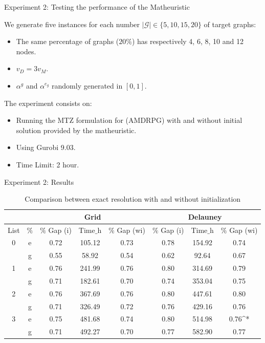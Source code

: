 \documentclass[slidestop,usepdftitle=false,10pt]{beamer}
\begin{document}
	\begin{frame}{Experiment 2: Testing the performance of the Matheuristic}
	
    We generate five instances for each number $|\mathcal G|\in\{5, 10, 15, 20\}$ of target graphs:
    \begin{itemize}
        \item The same percentage of graphs ($20\%$) has respectively 4, 6, 8, 10 and 12 nodes.
        \item $v_D= 3v_M$.
        \item $\alpha^g$ and $\alpha^{e_g}$ randomly generated in $[0, 1]$.
    \end{itemize}
    
    The experiment consists on:
    \begin{itemize}
        \item Running the MTZ formulation for (AMDRPG) with and without initial solution provided by the matheuristic.
        \item Using Gurobi 9.03.
        \item Time Limit: 2 hour.
    \end{itemize}
	    
	\end{frame}
	
	\begin{frame}{Experiment 2: Results}
    \renewcommand{\arraystretch}{0.7}
    \begin{table}[!h]
    \caption{Comparison between exact resolution with and without initialization}
    \centering
    \footnotesize
    \begin{tabular}{c c | c c c | c c c}
    \hline
     &  & \multicolumn{3}{c}{\textbf{Grid}} &  \multicolumn{3}{c}{\textbf{Delauney}} \\
    \hline
     List &  $\%$  & $\%$ Gap (i) & Time$\_$h & $\%$ Gap (wi)  & $\%$ Gap (i) & Time$\_$h &  $\%$ Gap (wi)\\
    \hline
    \multirow{}{}{0} & e & 0.72 & 105.12 & 0.73 & 0.78 & 154.92 & 0.74\\
    & g & 0.55 & 58.92 & 0.54 & 0.62 & 92.64 & 0.67\\
    \hline
    \multirow{}{}{1} & e & 0.76 & 241.99 & 0.76 & 0.80 & 314.69 & 0.79\\
    & g & 0.71 & 182.61 & 0.70 & 0.74 & 353.04 & 0.75\\
    \hline
    \multirow{}{}{2} & e & 0.76 & 367.69 & 0.76 & 0.80 & 447.61 & 0.80 \\
    & g & 0.71 & 326.49 & 0.72 & 0.76 & 429.16 & 0.76\\
    \hline
    \multirow{}{}{3} & e & 0.75 & 481.68 & 0.74 & 0.80 & 514.98 & 0.76^*\\
    & g & 0.71 & 492.27 & 0.70 & 0.77 & 582.90 & 0.77\\
        \hline
    \end{tabular}
    \label{table:tab4}
    \end{table}
	\end{frame}
	
\end{document}
